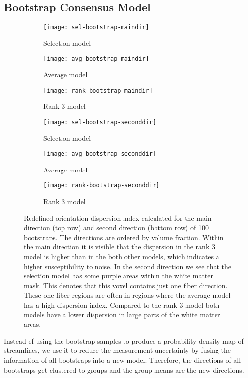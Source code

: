 \subsection{Bootstrap Consensus Model}
\begin{figure*}[t]
	\centering
	\begin{subfigure}[b]{0.33\linewidth}
		\texttt{[image: sel-bootstrap-maindir]}
		\caption{Selection model}
	\end{subfigure}
	\begin{subfigure}[b]{0.33\linewidth}
		\texttt{[image: avg-bootstrap-maindir]}
		\caption{Average model}
	\end{subfigure}
	\begin{subfigure}[b]{0.33\linewidth}
		\texttt{[image: rank-bootstrap-maindir]}
		\caption{Rank 3 model}
	\end{subfigure}
	\begin{subfigure}[b]{0.33\linewidth}
		\texttt{[image: sel-bootstrap-seconddir]}
		\caption{Selection model}
		\label{fig:sel-bottom}
	\end{subfigure}
	\begin{subfigure}[b]{0.33\linewidth}
		\texttt{[image: avg-bootstrap-seconddir]}
		\caption{Average model}
	\end{subfigure}
	\begin{subfigure}[b]{0.33\linewidth}
		\texttt{[image: rank-bootstrap-seconddir]}
		\caption{Rank 3 model}
	\end{subfigure}
	\caption{Redefined orientation dispersion index calculated for the main
		direction (top row) and second direction (bottom row) of 100
		bootstraps. The directions are ordered by volume fraction.
Within the main direction it is visible that the dispersion in the rank $3$
model is higher than in the both other models, which indicates a higher
susceptibility to noise. In the second direction we see
that the selection model has some purple areas within the white matter mask.
This denotes that this voxel contains just one fiber direction. These one fiber
regions are often in regions where the average model has a high dispersion
index. Compared to the rank $3$ model both models have a lower dispersion in
large parts of the white matter areas. }
	\label{fig:dispersion}
\end{figure*}


Instead of using the bootstrap samples to produce a probability density map of
streamlines, we use it to reduce the measurement uncertainty by fusing the
information of all bootstraps into a new model. 
Therefore, the directions of all bootstraps get clustered to groups and the
group means are the new directions.

